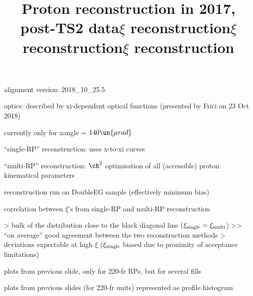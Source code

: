 
%

\newpage %

\def\author{J.~Kaspar}
\def\caption{Proton reconstruction, 2017, post-TS2}
\def\date{22 Feb 2019}

\newpage %
\title{Proton reconstruction in 2017, post-TS2 data}

\> alignment version: 2018\_10\_25.5

\> optics: described by xi-dependent optical functions (presented by Frici on 23 Oct 2018)

\> currently only for xangle = $140\un{\mu rad}$

\> ``single-RP'' reconstruction: uses x-to-xi curves

\> ``multi-RP'' reconstruction: $\ch^2$ optimisation of all (accessible) proton kinematical parameters

\> reconstruction run on DoubleEG sample (effectively minimum bias)



\newpage %
\title{$\xi$ reconstruction}

\> correlation between $\xi$'s from single-RP and multi-RP reconstruction

\centerline{}

\>> bulk of the distribution close to the black diagonal line ($\xi_{\rm single} = \xi_{\rm multi}$)
\>>> ``on average'' good agreement between the two reconstruction methods
\>> deviations expectable at high $\xi$ ($\xi_{\rm single}$ biased due to proximity of acceptance limitations)

\newpage %
\title{$\xi$ reconstruction}

\> plots from previous slide, only for 220-fr RPs, but for several fills

\centerline{}


\newpage %
\title{$\xi$ reconstruction}

\> plots from previous slides (for 220-fr units) represented as profile histogram

